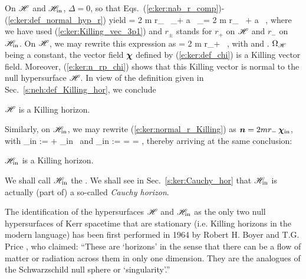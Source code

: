 On $\mathscr{H}$ and $\mathscr{H}_{\rm in}$, $\Delta=0$, so that
Eqs.~(\ref{e:ker:nab_r_comp})-(\ref{e:ker:def_normal_hyp_r})
yield
\be \label{e:ker:normal_r_Killing}
     = 2 m r_{\pm} \, \wpar_\ti + a \, \wpar_\tph = 2 m r_{\pm} \, \w{\xi}
        + a \, \w{\eta} ,
\ee
where we have used (\ref{e:ker:Killing_vec_3p1}) and $r_{\pm}$ stands for
$r_+$ on $\mathscr{H}$ and $r_-$ on $\mathscr{H}_{\rm in}$.
On $\mathscr{H}$, we may rewrite this expression as
\be \label{e:ker:n_rp_chi}
     = 2 m r_+ \, \w{\chi} ,
\ee
with
\be \label{e:ker:def_chi}
    \encadre{\w{\chi} := \w{\xi} + \Omega_{\Hor} \, \w{\eta} }
\ee
and
\be \label{e:ker:def_OmegaH}
    .
\ee
$\Omega_{\mathscr{H}}$ being a constant, the vector field $\bm{\chi}$ defined by
(\ref{e:ker:def_chi}) is a Killing vector field. Moreover, (\ref{e:ker:n_rp_chi})
shows that this Killing vector is normal to the null hypersurface $\mathscr{H}$.
In view of the definition given in Sec.~\ref{s:neh:def_Killing_hor}, we
conclude
\begin{prop}
$\mathscr{H}$ is a Killing horizon.
\end{prop}

Similarly, on $\mathscr{H}_{\rm in}$, we may rewrite (\ref{e:ker:normal_r_Killing})
as $\bm{n} = 2 m r_- \, \bm{\chi}_{\rm in}$, with
\be \label{e:ker:def_chi_in}
    \w{\chi}_{\rm in} := \w{\xi} + \Omega_{\rm in} \, \w{\eta}
\ee
and
\be \label{e:ker:def_Omega_in}
    \Omega_{\rm in} :=  = 
        =  ,
\ee
thereby arriving at the same conclusion:
\begin{prop}
$\mathscr{H}_{\rm in}$ is a Killing horizon.
\end{prop}
We shall call $\mathscr{H}_{\rm in}$ the . We shall see in Sec.~\ref{s:ker:Cauchy_hor} that $\mathscr{H}_{\rm in}$
is actually (part of) a so-called \emph{Cauchy horizon}.

\begin{hist}
The identification of the hypersurfaces $\mathscr{H}$ and $\mathscr{H}_{\rm in}$
as the only two null hypersurfaces of Kerr spacetime that are stationary
(i.e. Killing horizons in the modern language) has been first performed in
1964 by Robert H. Boyer
and T.G. Price \cite{BoyerP65}, who claimed: ``These are `horizons'
in the sense that there can be a flow of matter or radiation across them in only one dimension. They are the analogues of the Schwarzschild null sphere or `singularity'.''
\end{hist}

